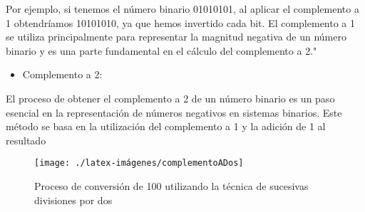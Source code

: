 Por ejemplo, si tenemos el número binario 01010101, al aplicar el complemento a 1 obtendríamos 10101010, ya que hemos invertido cada bit. El complemento a 1 se utiliza principalmente para representar la magnitud negativa de un número binario y es una parte fundamental en el cálculo del complemento a 2."
\newline

\begin{itemize}
    \item Complemento a 2:
\end{itemize}
El proceso de obtener el complemento a 2 de un número binario es un paso esencial en la representación de números negativos en sistemas binarios. Este método se basa en la utilización del complemento a 1 y la adición de 1 al resultado
\newline

\begin{figure}
\centerline{\texttt{[image: ./latex-imágenes/complementoADos]}}
\caption{Proceso de conversión de 100 utilizando la técnica de sucesivas divisiones por dos}
\vspace*{-5pt}
\label{fig:dos}
\end{figure}


